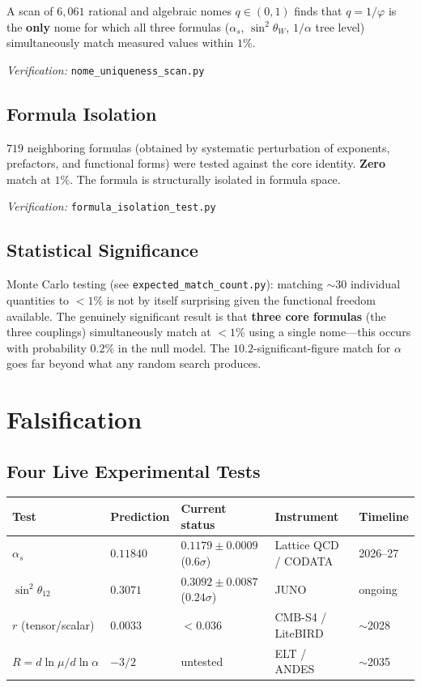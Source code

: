 \documentclass[11pt,a4paper]{article}
\newcommand{\vp}{\varphi}
\begin{document}
A scan of $6{,}061$ rational and algebraic nomes $q \in (0,1)$ finds that
$q = 1/\vp$ is the \textbf{only} nome for which all three formulas
($\alpha_s$, $\sin^2\!\theta_W$, $1/\alpha$ tree level) simultaneously match
measured values within $1\%$.

\emph{Verification:} \texttt{nome\_uniqueness\_scan.py}

\subsection{Formula Isolation}

$719$ neighboring formulas (obtained by systematic perturbation of exponents,
prefactors, and functional forms) were tested against the core identity.
\textbf{Zero} match at $1\%$.  The formula is structurally isolated in
formula space.

\emph{Verification:} \texttt{formula\_isolation\_test.py}

\subsection{Statistical Significance}

Monte Carlo testing (see \texttt{expected\_match\_count.py}):
matching $\sim\!30$ individual quantities to $<1\%$ is not by itself surprising
given the functional freedom available.  The genuinely significant result is that
\textbf{three core formulas} (the three couplings) simultaneously match at $<1\%$
using a single nome---this occurs with probability $0.2\%$ in the null model.
The $10.2$-significant-figure match for $\alpha$ goes far beyond what any
random search produces.

\section{Falsification}
\label{sec:falsification}

\subsection{Four Live Experimental Tests}

\begin{center}
\begin{tabular}{@{}lllll@{}}
\toprule
Test & Prediction & Current status & Instrument & Timeline \\
\midrule
$\alpha_s$ & $0.11840$ & $0.1179 \pm 0.0009$ ($0.6\sigma$)
  & Lattice QCD / CODATA & 2026--27 \\
$\sin^2\!\theta_{12}$ & $0.3071$ & $0.3092 \pm 0.0087$ ($0.24\sigma$)
  & JUNO & ongoing \\
$r$ (tensor/scalar) & $0.0033$ & $< 0.036$
  & CMB-S4 / LiteBIRD & $\sim$2028 \\
$R = d\!\ln\mu/d\!\ln\alpha$ & $-3/2$ & untested
  & ELT / ANDES & $\sim$2035 \\
\bottomrule
\end{tabular}
\end{center}
\end{document}
